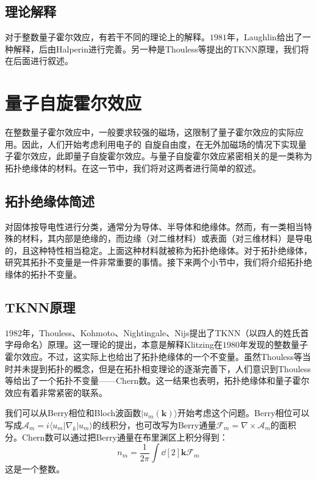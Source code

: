 \subsection{理论解释}

对于整数量子霍尔效应，有若干不同的理论上的解释。$1981$年，Laughlin给出了一种解释\cite{RN23}，后由Halperin进行完善\cite{RN24}。另一种是Thouless等提出的TKNN原理，我们将在后面进行叙述。

\section{量子自旋霍尔效应}

在整数量子霍尔效应中，一般要求较强的磁场，这限制了量子霍尔效应的实际应用。因此，人们开始考虑利用电子的
自旋自由度，在无外加磁场的情况下实现量子霍尔效应，此即量子自旋霍尔效应。与量子自旋霍尔效应紧密相关的是一类称为拓扑绝缘体的材料。在这一节中，我们将对这两者进行简单的叙述。

\subsection{拓扑绝缘体简述}

对固体按导电性进行分类，通常分为导体、半导体和绝缘体。然而，有一类相当特殊的材料，其内部是绝缘的，而边缘（对二维材料）或表面（对三维材料）是导电的，且这种特性相当稳定。上面这种材料就被称为拓扑绝缘体。对于拓扑绝缘体，研究其拓扑不变量是一件非常重要的事情。接下来两个小节中，我们将介绍拓扑绝缘体的拓扑不变量。

\subsection{TKNN原理}

$1982$年，Thouless、Kohmoto、Nightingale、Nijs提出了TKNN（以四人的姓氏首字母命名）原理\cite{RN25}。这一理论的提出，本意是解释Klitzing在$1980$年发现的整数量子霍尔效应。不过，这实际上也给出了拓扑绝缘体的一个不变量。虽然Thouless等当时并未提到拓扑的概念，但是在拓扑相变理论的逐渐完善下，人们意识到Thouless等给出了一个拓扑不变量——Chern数。这一结果也表明，拓扑绝缘体和量子霍尔效应有着非常紧密的联系。

我们可以从Berry相位\cite{RN26}和Bloch波函数$|u_m(\mathbf k)\rangle$开始考虑这个问题。Berry相位可以写成$\mathcal{A}_m=i\langle u_m|\nabla_k|u_m\rangle$的线积分，也可改写为Berry通量$\mathcal{F}_m=\nabla\times\mathcal{A}_m$的面积分。Chern数可以通过把Berry通量在布里渊区上积分得到：
\begin{equation}
    n_m=\frac{1}{2\pi}\int \dd[2]{\mathbf{k}\mathcal{F}_m}
\end{equation}
这是一个整数。

